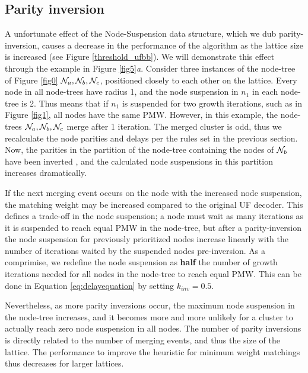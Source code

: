 \subsection{Parity inversion}\label{sec:inversion}

A unfortunate effect of the Node-Suspension data structure, which we dub parity-inversion, causes a decrease in the performance of the algorithm as the lattice size is increased (see Figure \ref{threshold_ufbb}). We will demonstrate this effect through the example in Figure \ref{fig5}\emph{a}. Consider three instances of the node-tree of Figure \ref{fig0} $\mathcal{N}_a, \mathcal{N}_b, \mathcal{N}_c$, positioned closely to each other on the lattice. Every node in all node-trees have radius 1, and the node suspension in $n_1$ in each node-tree is 2. Thus means that if $n_1$ is suspended for two growth iterations, such as in Figure \ref{fig1}, all nodes have the same PMW. However, in this example, the node-trees $\mathcal{N}_a, \mathcal{N}_b, \mathcal{N}_c$ merge after 1 iteration. The merged cluster is odd, thus we recalculate the node parities and delays per the rules set in the previous section. Now, the parities in the partition of the node-tree containing the nodes of $\mathcal{N}_b$ have been inverted , and the calculated node suspensions in this partition increases dramatically. 

If the next merging event occurs on the node with the increased node suspension, the matching weight may be increased compared to the original UF decoder. This defines a trade-off in the node suspension; a node must wait as many iterations as it is suspended to reach equal PMW in the node-tree, but after a parity-inversion the node suspension for previously prioritized nodes increase linearly with the number of iterations waited by the suspended nodes pre-inversion. As a comprimise, we redefine the node suspension as \textbf{half} the number of growth iterations needed for all nodes in the node-tree to reach equal PMW. This can be done in Equation \eqref{eq:delayequation} by setting $k_{inv}=0.5$.

Nevertheless, as more parity inversions occur, the maximum node suspension in the node-tree increases, and it becomes more and more unlikely for a cluster to actually reach zero node suspension in all nodes. The number of parity inversions is directly related to the number of merging events, and thus the size of the lattice. The performance to improve the heuristic for minimum weight matchings thus decreases for larger lattices. 

